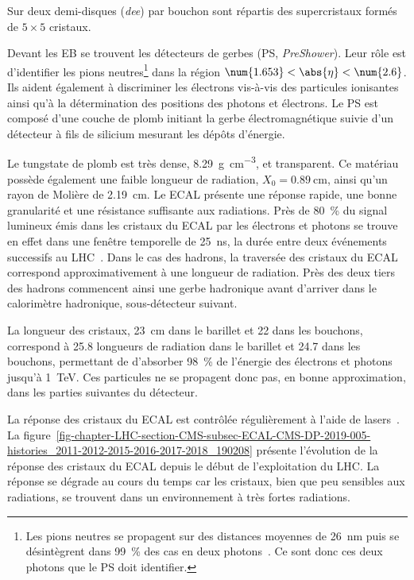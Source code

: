Sur deux demi-disques (\emph{dee}) par bouchon sont répartis des \og supercristaux \fg{} formés de $5\times5$ cristaux.
\par Devant les EB se trouvent les détecteurs de gerbes (PS, \emph{PreShower}).
Leur rôle est d'identifier les pions neutres\footnote{Les pions neutres se propagent sur des distances moyennes de \SI{26}{\nano\meter} puis se désintègrent dans \SI{99}{\%} des cas en deux photons~\cite{PDG_booklet_2020}. Ce sont donc ces deux photons que le PS doit identifier.} dans la région $\num{1.653}<\abs{\eta}<\num{2.6}$.
Ils aident également à discriminer les électrons vis-à-vis des particules ionisantes ainsi qu'à la détermination des positions des photons et électrons.
Le PS est composé d'une couche de plomb initiant la gerbe électromagnétique suivie d'un détecteur à fils de silicium mesurant les dépôts d'énergie.
\par Le tungstate de plomb est très dense, \SI{8.29}{\gram.\centi\meter^{-3}}, et transparent.
Ce matériau possède également une faible longueur de radiation, $X_0=\SI{0.89}{\centi\meter}$, ainsi qu'un rayon de Molière de \SI{2.19}{\centi\meter}.
Le ECAL présente une réponse rapide, une bonne granularité et une résistance suffisante aux radiations.
Près de \SI{80}{\%} du signal lumineux émis dans les cristaux du ECAL par les électrons et photons se trouve en effet dans une fenêtre temporelle de \SI{25}{\nano\second}, la durée entre deux événements successifs au LHC~\cite{cms_paper}.
Dans le cas des hadrons, la traversée des cristaux du ECAL correspond approximativement à une longueur de radiation.
Près des deux tiers des hadrons commencent ainsi une gerbe hadronique avant d'arriver dans le calorimètre hadronique, sous-détecteur suivant.
\par La longueur des cristaux, \SI{23}{\centi\meter} dans le barillet et \num{22} dans les bouchons, correspond à \num{25.8} longueurs de radiation dans le barillet et \num{24.7} dans les bouchons, permettant de d'absorber \SI{98}{\%} de l'énergie des électrons et photons jusqu'à \SI{1}{\TeV}.
Ces particules ne se propagent donc pas, en bonne approximation, dans les parties suivantes du détecteur.
\par La réponse des cristaux du ECAL est contrôlée régulièrement à l'aide de lasers~\cite{CMS-DP-2019-005}.
La figure~\ref{fig-chapter-LHC-section-CMS-subsec-ECAL-CMS-DP-2019-005-histories_2011-2012-2015-2016-2017-2018_190208} présente l'évolution de la réponse des cristaux du ECAL depuis le début de l'exploitation du LHC.
La réponse se dégrade au cours du temps car les cristaux, bien que peu sensibles aux radiations, se trouvent dans un environnement à très fortes radiations.
